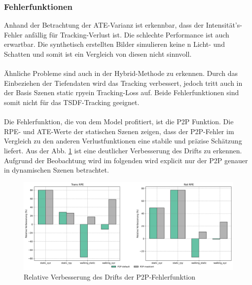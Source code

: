 \documentclass[12pt,DIV=15,BCOR=15mm,twoside,headsepline,abstract=true,listof=totoc,bibliography=totoc]{scrreprt}
\theoremstyle{remark}    %
\begin{document}
    \subsubsection{Fehlerfunktionen}
    Anhand der Betrachtung der \ac{ATE}-Varianz ist erkennbar, dass der Intensität's-Fehler anfällig für Tracking-Verlust ist. 
    Die schlechte Performance ist auch erwartbar. Die synthetisch erstellten Bilder simulieren keine n Licht- und Schatten und somit ist ein Vergleich von diesen
    nicht sinnvoll.\\\\
    Ähnliche Probleme sind auch in der Hybrid-Methode zu erkennen. Durch das Einbeziehen der Tiefendaten wird das Tracking verbessert, jedoch tritt auch in 
    der Basis Szenen \glqq static rpy\grqq ein Tracking-Loss auf. Beide Fehlerfunktionen sind somit nicht für das \ac{TSDF}-Tracking geeignet.\\\\
    Die Fehlerfunktion, die von dem Model profitiert, ist die \ac{P2P} Funktion. Die \ac{RPE}- und \ac{ATE}-Werte der statischen Szenen zeigen, dass der \ac{P2P}-Fehler im 
    Vergleich zu den anderen Verlustfunktionen eine stabile und präzise Schätzung liefert. Aus der Abb. \ref{fig:p2p_rel_RPE} ist eine deutlicher Verbesserung des 
    Drifts zu erkennen. Aufgrund der Beobachtung wird im folgenden wird explicit nur der \ac{P2P} genauer in dynamischen Szenen betrachtet.
    \begin{figure}[h]
        \centering
        \includegraphics[width=\textwidth]{pics/compose_RPE_com.png}
        \caption{Relative Verbesserung des Drifts der P2P-Fehlerfunktion}
        \label{fig:p2p_rel_RPE}
    \end{figure}
\end{document}
